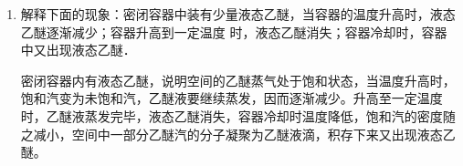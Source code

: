 \begin{enumerate}
    
\begin{solution}
  (b)(e)是正确的。
\end{solution}
\item 解释下面的现象：密闭容器中装有少量液态乙醚，当容器的温度升高时，液态乙醚逐渐减少；容器升高到一定温度
时，液态乙醚消失；容器冷却时，容器中又出现液态乙醚．
    
\begin{solution}
  密闭容器内有液态乙醚，说明空间的乙醚蒸气处于饱和状态，当温度升高时，饱和汽变为未饱和汽，乙醚液要继续蒸发，因而逐渐减少。升高至一定温度时，乙醚液蒸发完毕，液态乙醚消失，容器冷却时温度降低，饱和汽的密度随之减小，空间中一部分乙醚汽的分子凝聚为乙醚液滴，积存下来又出现液态乙醚。
\end{solution}
\end{enumerate}




